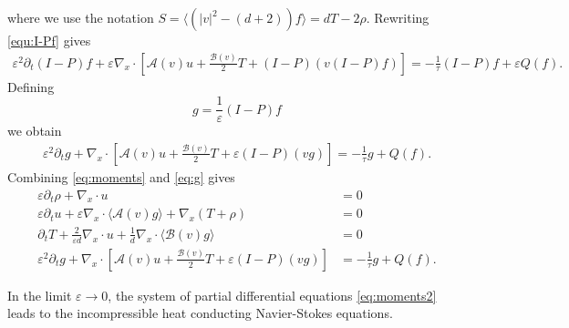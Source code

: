 \documentclass[final,11pt]{siamart251216}
\numberwithin{equation}{section}
\theoremstyle{definition}
\theoremstyle{remark}
\begin{document}
where we use the notation $S = \langle (|v|^2 - (d+2))f \rangle = dT - 2\rho$.
Rewriting \eqref{equ:I-Pf} gives
\begin{align*}
\varepsilon^2 \partial_t (I-P)f + \varepsilon \nabla_x \cdot \left[ \mathcal{A}(v) u + \frac{\mathcal{B}(v)}{2} T + (I-P) (v(I-P)f)\right] = - \frac{1}{\tau} (I-P)f + \varepsilon Q(f).
\end{align*}
Defining 
\[
g = \frac{1}{\varepsilon} (I-P)f
\]
we obtain
\begin{align}
\varepsilon^2 \partial_t g +  \nabla_x \cdot \left[ \mathcal{A}(v) u + \frac{\mathcal{B}(v)}{2} T + \varepsilon (I-P) (vg)\right] = - \frac{1}{\tau} g + Q(f). \label{eq:g}
\end{align}
Combining \eqref{eq:moments} and \eqref{eq:g} gives
\begin{align}
\varepsilon \partial_t \rho +  \nabla_x \cdot u &= 0 \nonumber \\
\varepsilon \partial_t u + \varepsilon \nabla_x \cdot \langle \mathcal{A}(v) g \rangle +  \nabla_x (T+\rho) &= 0\nonumber \label{eq:moments2} \\
\partial_t T + \frac{2}{\varepsilon d} \nabla_x \cdot u + \frac{1}{d}\nabla_x \cdot \langle \mathcal{B}(v) g \rangle &= 0  \\  \nonumber
\varepsilon^2 \partial_t g +  \nabla_x \cdot \left[ \mathcal{A}(v) u + \frac{\mathcal{B}(v)}{2} T + \varepsilon (I-P) (vg)\right] &= - \frac{1}{\tau} g + Q(f).
\end{align}
\begin{theorem}
In the limit $\varepsilon \rightarrow 0$, the system of partial differential equations \eqref{eq:moments2} leads to the incompressible heat conducting Navier-Stokes equations.
\end{theorem}
\end{document}
